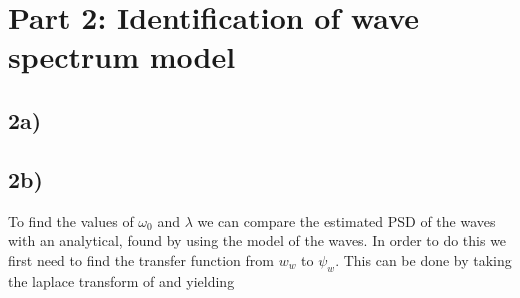 
\section{Part 2: Identification of wave spectrum model}

\subsection{2a)}



\subsection{2b)}
To find the values of $\omega_0$ and $\lambda$ we can compare the estimated PSD of the waves with an analytical, found by using the model of the waves. In order to do this we first need to find the transfer function from $w_w$ to $\psi_w$. This can be done by taking the laplace transform of  and  yielding

